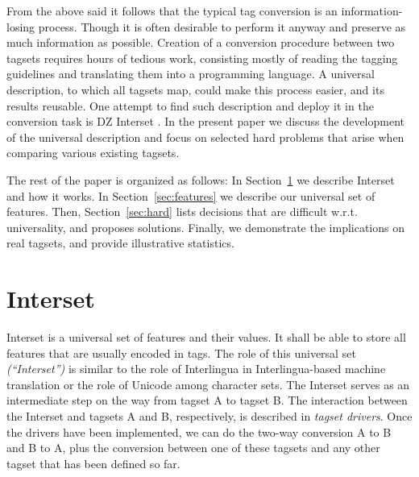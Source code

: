 \documentclass[11pt]{article}
\def\Sref#1{Section~\ref{#1}}
\newcommand{\XXX}{\textcolor{red}{XXX }} %
\begin{document}
From the above said it follows that the typical tag conversion is an information-losing process. Though it is often desirable to perform it anyway and preserve as much information as possible. Creation of a conversion procedure between two tagsets requires hours of tedious work, consisting mostly of reading the tagging guidelines and translating them into a programming language. A universal description, to which all tagsets map, could make this process easier, and its results reusable. One attempt to find such description and deploy it in the conversion task is DZ Interset \citep{biblio:ZeReusableTagset2008}. In the present paper we discuss the development of the universal description and focus on selected hard problems that arise when comparing various existing tagsets.


The rest of the paper is organized as follows: In \Sref{sec:interset} we describe Interset and how it works. In \Sref{sec:features} we describe our universal set of features. Then, \Sref{sec:hard} lists decisions that are difficult w.r.t. universality, and proposes solutions. Finally, we demonstrate the implications on real tagsets, and provide illustrative statistics.

\section{Interset}
\label{sec:interset}

Interset is a universal set of features and their values. It shall be able to store all features that are usually encoded in tags. The role of this universal set \textit{(“Interset”)} is similar to the role of Interlingua in Interlingua-based machine translation \citep{interlingua} or the role of Unicode among character sets. The Interset serves as an intermediate step on the way from tagset A to tagset B. The interaction between the Interset and tagsets A and B, respectively, is described in \textit{tagset drivers}. Once the drivers have been implemented, we can do the two-way conversion A to B and B to A, plus the conversion between one of these tagsets and any other tagset that has been defined so far.
\end{document}
